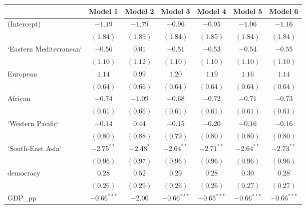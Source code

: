 
\begin{table}[!h]
\begin{center}
\begin{tabular}{l c c c c c c }
\toprule
 & Model 1 & Model 2 & Model 3 & Model 4 & Model 5 & Model 6 \\
\midrule
(Intercept)             & $-1.19$       & $-1.79$      & $-0.96$       & $-0.95$       & $-1.06$       & $-1.16$       \\
                        & $(1.84)$      & $(1.89)$     & $(1.84)$      & $(1.85)$      & $(1.84)$      & $(1.84)$      \\
`Eastern Mediterranean` & $-0.56$       & $0.01$       & $-0.51$       & $-0.53$       & $-0.54$       & $-0.55$       \\
                        & $(1.10)$      & $(1.12)$     & $(1.10)$      & $(1.10)$      & $(1.10)$      & $(1.10)$      \\
European                & $1.14$        & $0.99$       & $1.20$        & $1.19$        & $1.16$        & $1.14$        \\
                        & $(0.64)$      & $(0.66)$     & $(0.64)$      & $(0.64)$      & $(0.64)$      & $(0.64)$      \\
African                 & $-0.74$       & $-1.09$      & $-0.68$       & $-0.72$       & $-0.71$       & $-0.73$       \\
                        & $(0.61)$      & $(0.66)$     & $(0.61)$      & $(0.61)$      & $(0.61)$      & $(0.61)$      \\
`Western Pacific`       & $-0.14$       & $0.44$       & $-0.15$       & $-0.20$       & $-0.16$       & $-0.16$       \\
                        & $(0.80)$      & $(0.88)$     & $(0.79)$      & $(0.80)$      & $(0.80)$      & $(0.80)$      \\
`South-East Asia`       & $-2.75^{**}$  & $-2.48^{*}$  & $-2.64^{**}$  & $-2.71^{**}$  & $-2.64^{**}$  & $-2.73^{**}$  \\
                        & $(0.96)$      & $(0.97)$     & $(0.96)$      & $(0.96)$      & $(0.96)$      & $(0.96)$      \\
democracy               & $0.28$        & $0.52$       & $0.29$        & $0.28$        & $0.30$        & $0.28$        \\
                        & $(0.26)$      & $(0.29)$     & $(0.26)$      & $(0.26)$      & $(0.27)$      & $(0.27)$      \\
GDP\_pp                 & $-0.66^{***}$ & $-2.00$      & $-0.66^{***}$ & $-0.65^{***}$ & $-0.66^{***}$ & $-0.66^{***}$ \\

\end{tabular}
\end{center}
\end{table}
